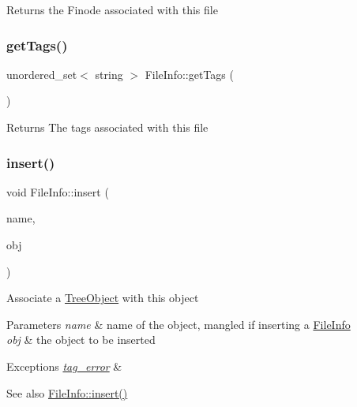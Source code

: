 \begin{DoxyReturn}{Returns}
the Finode associated with this file 
\end{DoxyReturn}
\mbox{\label{classFileInfo_a0335ecd3301d3dd709de5e004567fd29}} 
\subsubsection{\texorpdfstring{get\+Tags()}{getTags()}}
{\footnotesize\ttfamily unordered\+\_\+set$<$ string $>$ File\+Info\+::get\+Tags (\begin{DoxyParamCaption}{ }\end{DoxyParamCaption})}

\begin{DoxyReturn}{Returns}
The tags associated with this file 
\end{DoxyReturn}
\mbox{\label{classFileInfo_ad93a84b63e417b07aa68b619051ab746}} 
\subsubsection{\texorpdfstring{insert()}{insert()}}
{\footnotesize\ttfamily void File\+Info\+::insert (\begin{DoxyParamCaption}\item[{string}]{name,  }\item[{\mbox{\hyperlink{classTreeObject}{Tree\+Object}} $\ast$}]{obj }\end{DoxyParamCaption})\hspace{0.3cm}{\ttfamily [virtual]}}

Associate a \mbox{\hyperlink{classTreeObject}{Tree\+Object}} with this object 
\begin{DoxyParams}{Parameters}
{\em name} & name of the object, mangled if inserting a \mbox{\hyperlink{classFileInfo}{File\+Info}} \\
\hline
{\em obj} & the object to be inserted \\
\hline
\end{DoxyParams}

\begin{DoxyExceptions}{Exceptions}
{\em \mbox{\hyperlink{classtag__error}{tag\+\_\+error}}} & \\
\hline
\end{DoxyExceptions}
\begin{DoxySeeAlso}{See also}
\mbox{\hyperlink{classFileInfo_ad93a84b63e417b07aa68b619051ab746}{File\+Info\+::insert()}} 
\end{DoxySeeAlso}


